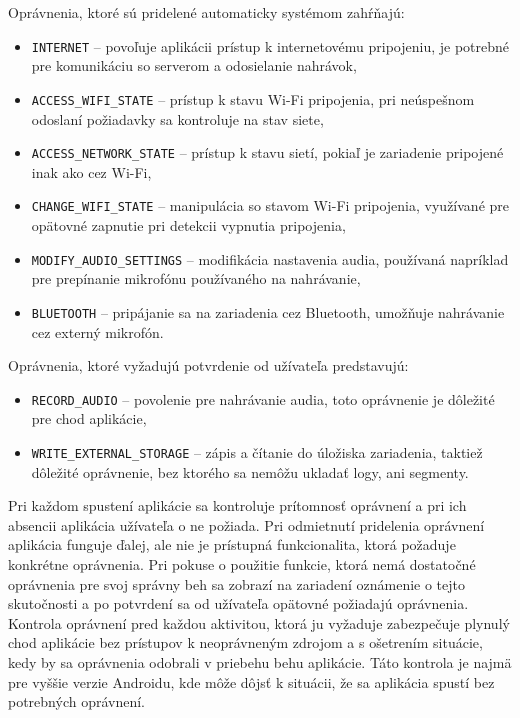 Oprávnenia, ktoré sú pridelené automaticky systémom zahŕňajú:
\begin{itemize}
  \item{\texttt{INTERNET} -- povoľuje aplikácii prístup k internetovému pripojeniu, je potrebné pre komunikáciu so serverom a odosielanie nahrávok,}
  \item{\texttt{ACCESS\_WIFI\_STATE} -- prístup k stavu Wi-Fi pripojenia, pri neúspešnom odoslaní požiadavky sa kontroluje na stav siete,}
  \item{\texttt{ACCESS\_NETWORK\_STATE} -- prístup k stavu sietí, pokiaľ je zariadenie pripojené inak ako cez Wi-Fi,}
  \item{\texttt{CHANGE\_WIFI\_STATE} -- manipulácia so stavom Wi-Fi pripojenia, využívané pre opätovné zapnutie pri detekcii vypnutia pripojenia,}
  \item{\texttt{MODIFY\_AUDIO\_SETTINGS} -- modifikácia nastavenia audia, používaná napríklad pre prepínanie mikrofónu používaného na nahrávanie,}
  \item{\texttt{BLUETOOTH} -- pripájanie sa na zariadenia cez Bluetooth, umožňuje nahrávanie cez externý mikrofón.}
\end{itemize}

Oprávnenia, ktoré vyžadujú potvrdenie od užívateľa predstavujú:
\begin{itemize}
  \item{\texttt{RECORD\_AUDIO} -- povolenie pre nahrávanie audia, toto oprávnenie je dôležité pre chod aplikácie,}
  \item{\texttt{WRITE\_EXTERNAL\_STORAGE} -- zápis a čítanie do úložiska zariadenia, taktiež dôležité oprávnenie, bez ktorého sa nemôžu ukladať logy, ani segmenty.}
\end{itemize}

Pri každom spustení aplikácie sa kontroluje prítomnosť oprávnení a pri ich absencii aplikácia užívateľa o ne požiada. Pri odmietnutí pridelenia oprávnení aplikácia funguje ďalej, ale nie je prístupná funkcionalita, ktorá požaduje konkrétne oprávnenia. Pri pokuse o použitie funkcie, ktorá nemá dostatočné oprávnenia pre svoj správny beh sa zobrazí na zariadení oznámenie o tejto skutočnosti a po potvrdení sa od užívateľa opätovné požiadajú oprávnenia. Kontrola oprávnení pred každou aktivitou, ktorá ju vyžaduje zabezpečuje plynulý chod aplikácie bez prístupov k neoprávneným zdrojom a s ošetrením situácie, kedy by sa oprávnenia odobrali v priebehu behu aplikácie. Táto kontrola je najmä pre vyššie verzie Androidu, kde môže dôjsť k situácii, že sa aplikácia spustí bez potrebných oprávnení.

